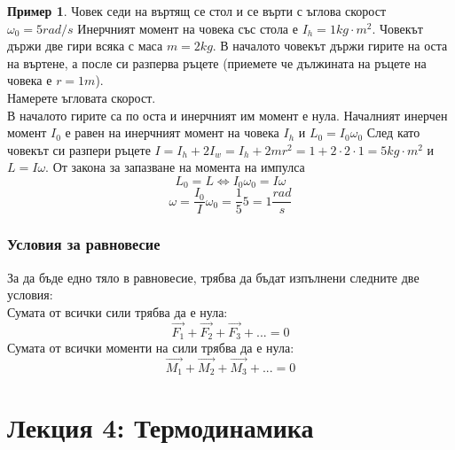 \documentclass[fleqn, 12pt]{article}
\theoremstyle{definition}
\newtheorem{example}{Пример}[subsection]
\begin{document}
\begin{example}
Човек седи на въртящ се стол и се върти с ъглова скорост $ \omega_0 = 5 rad/s $ Инерчният момент на човека със стола е $I_h = 1 kg\cdot m^2$. Човекът държи две гири всяка с маса $m = 2 kg$. В началото човекът държи гирите на оста на въртене, а после си разперва ръцете (приемете че дължината на ръцете на човека е $r = 1 m$).\\
Намерете ъгловата скорост.\\
В началото гирите са по оста и инерчният им момент е нула. Началният инерчен момент $I_0$ е равен на инерчният момент на човека $I_h$ и $L_0 = I_0 \omega_0$ След като човекът си разпери ръцете $I = I_h + 2I_w = I_h + 2mr^2 = 1 + 2 \cdot 2 \cdot 1 = 5 kg\cdot m^2$ и $L = I \omega$. От закона за запазване на момента на импулса
$$L_0 = L \Leftrightarrow I_0 \omega_0 = I\omega$$
$$\omega = \dfrac{I_0}{I} \omega_0 = \dfrac{1}{5} 5 = 1 \dfrac{rad}{s}$$
\end{example}

\subsubsection{Условия за равновесие}
За да бъде едно тяло в равновесие, трябва да бъдат изпълнени следните две условия: \\
Сумата от всички сили трябва да е нула:
$$\vec{F_1} + \vec{F_2} + \vec{F_3} + ... = 0$$
Сумата от всички моменти на сили трябва да е нула:
$$\vec{M_1} + \vec{M_2} + \vec{M_3} + ... = 0$$

\newpage
\section{Лекция 4: Термодинамика}
\end{document}
